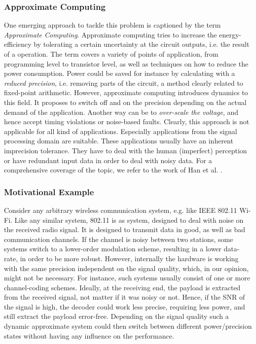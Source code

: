 \documentclass[conference]{IEEEtran}
\begin{document}
\subsubsection*{Approximate Computing}
One emerging approach to tackle this problem is captioned by the term \emph{Approximate Computing}. Approximate computing tries to increase the energy-efficiency by tolerating a certain uncertainty at the circuit outputs, i.e. the result of a operation. The term covers a variety of points of application, from programming level to transistor level, as well as techniques on how to reduce the power consumption. Power could be saved for instance by calculating with a \emph{reduced precision}, i.e. removing parts of the circuit, a method clearly related to fixed-point arithmetic. However, approximate computing introduces dynamics to this field. It proposes to switch off and on the precision depending on the actual demand of the application. Another way can be to \emph{over-scale the voltage}, and hence accept timing violations or noise-based faults. 
Clearly, this approach is not applicable for all kind of applications. Especially applications from the signal processing domain are suitable. These applications usually have an inherent imprecision tolerance. They have to deal with the human (imperfect) perception or have redundant input data in order to deal with noisy data. For a comprehensive coverage of the topic, we refer to the work of Han et al. \cite{han_approximate_2013}.
\subsubsection*{Motivational Example}
Consider any arbitrary wireless communication system, e.g. like IEEE 802.11 Wi-Fi. Like any similar system, 802.11 is as system, designed to deal with noise on the received radio signal. It is designed to transmit data in good, as well as bad communication channels. If the channel is noisy between two stations, some systems switch to a lower-order modulation scheme, resulting in a lower data-rate, in order to be more robust. However, internally the hardware is working with the same precision independent on the signal quality, which, in our opinion, might not be necessary. For instance, such systems usually consist of one or more channel-coding schemes. Ideally, at the receiving end, the payload is extracted from the received signal, not matter if it was noisy or not. Hence, if the SNR of the signal is high, the decoder could work less precise, requiring less power, and still extract the payload error-free. Depending on the signal quality such a dynamic approximate system could then switch between different power/precision states without having any influence on the performance.
\end{document}

